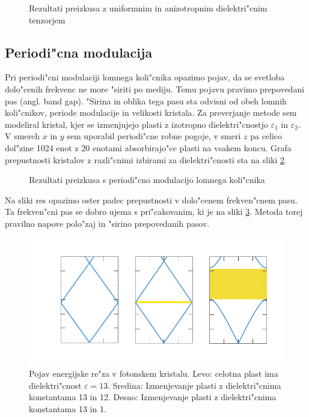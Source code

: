 \documentclass[a4paper,10pt]{article}
\begin{document}
\begin{figure}[h]
 
 \caption{Rezultati preizkusa z uniformnim in anizotropnim dielektri"cnim tenzorjem}
 \label{fig:test-uniform}
\end{figure}

\newpage
\subsection{Periodi"cna modulacija}

Pri periodi"cni modulaciji lomnega koli"cnika opazimo pojav, da se svetloba dolo"cenih frekvenc ne more "siriti po mediju\cite{joannopoulos}. 
Temu pojavu pravimo prepovedani pas (angl. band gap). 
"Sirina in oblika tega pasu sta odvisni od obeh lomnih koli"cnikov, periode modulacije in velikosti kristala. 
Za preverjanje metode sem modeliral kristal, kjer se izmenjujejo plasti z izotropno dielektri"cnostjo $\varepsilon_1$ in $\varepsilon_2$. 
V smereh $x$ in $y$ sem uporabil periodi"cne robne pogoje, v smeri $z$ pa celico dol"zine 1024 enot z 20 enotami absorbirajo"ce plasti na vsakem koncu. 
Grafa prepustnosti kristalov z razli"cnimi izbirami za dielektri"cnosti sta na sliki \ref{fig:test-periodic}. 

\begin{figure}[h]
 
 \caption{Rezultati preizkusa s periodi"cno modulacijo lomnega koli"cnika}
 \label{fig:test-periodic}
\end{figure}

Na sliki res opazimo oster padec prepustnosti v dolo"cenem frekven"cnem pasu. 
Ta frekven"cni pas se dobro ujema s pri"cakovanim, ki je na sliki \ref{fig:joannopoulos-crystal}. 
Metoda torej pravilno napove polo"zaj in "sirino prepovedanih pasov. 

\begin{figure}[h]
\centering
 \includegraphics[width=.8\textwidth]{./Slike/bandgap}
 \caption{Pojav energijske re"za v fotonskem kristalu. Levo: celotna plast ima dielektri"cnost $\varepsilon = 13$. Sredina: Izmenjevanje plasti z dielektri"cnima konstantama 13 in 12. Desno: Izmenjevanje plasti z dielektri"cnima konstantama 13 in 1. \cite{joannopoulos}}
 \label{fig:joannopoulos-crystal}
\end{figure}
\end{document}
